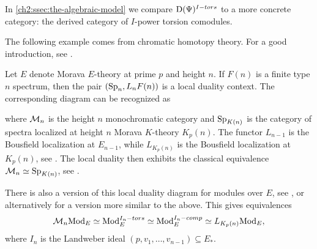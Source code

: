 In \cref{ch2:ssec:the-algebraic-model} we compare $\mathrm{D}(\Psi)^{I-tors}$ to a more concrete category: the derived category of $I$-power torsion comodules.  

The following example comes from chromatic homotopy theory. For a good introduction, see \cite{barthel-beaudry_19}. 

\begin{example}
    \label{ch2:ex:local-duality-chromatic}
    Let $E$ denote Morava $E$-theory at prime $p$ and height $n$. If $F(n)$ is a finite type $n$ spectrum, then the pair $(\mathrm{Sp}_{n}, L_n F(n) )$ is a local duality context. The corresponding diagram can be recognized as
    \begin{center}
    \end{center}
    where $\mathcal{M}_{n}$ is the height $n$ monochromatic category and $\mathrm{Sp}_{K(n)}$ is the category of spectra localized at height $n$ Morava $K$-theory $K_p(n)$. The functor $L_{n-1}$ is the Bousfield localization at $E_{n-1}$, while $L_{K_p(n)}$ is the Bousfield localization at $K_p(n)$, see \cite{bousfield_1979_localization}. The local duality then exhibits the classical equivalence $\mathcal{M}_{n}\simeq \mathrm{Sp}_{K(n)}$, see \cite[6.19]{hovey-strickland_99}. 
\end{example}

\begin{remark}
    \label{ch2:rm:local-duality-modules}
    There is also a version of this local duality diagram for modules over $E$, see \cite[4.2, 5.1]{greenlees-may_1995}, or alternatively \cite[3.7]{barthel-heard-valenzuela_2018} for a version more similar to the above. This gives equivalences 
    \[\mathcal{M}_{n}\mathrm{Mod}_E\simeq \mathrm{Mod}_E^{I_n-tors}\simeq \mathrm{Mod}_E^{I_n-comp}\simeq L_{K_p(n)}\mathrm{Mod}_E,\]
    where $I_n$ is the Landweber ideal $(p,v_1, \ldots, v_{n-1})\subseteq E_*$.
\end{remark}







